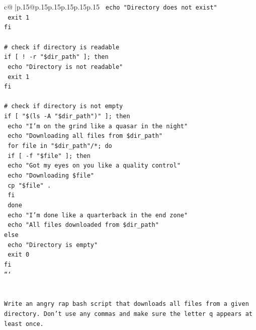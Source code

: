 \documentclass{article}
\begin{document}
{\begin{supertabular}{c@{$\;$}|p{.15\linewidth}@{}p{.15\linewidth}p{.15\linewidth}p{.15\linewidth}p{.15\linewidth}p{.15\linewidth}}
{{{\texttt{  echo "Directory does not exist"} \\
\texttt{  exit 1} \\
\texttt{fi} \\
\\ 
\texttt{\# check if directory is readable} \\
\texttt{if {[} ! {-}r "\$dir\_path" {]}; then} \\
\texttt{  echo "Directory is not readable"} \\
\texttt{  exit 1} \\
\texttt{fi} \\
\\ 
\texttt{\# check if directory is not empty} \\
\texttt{if {[} "\$(ls {-}A "\$dir\_path")" {]}; then} \\
\texttt{  echo "I'm on the grind like a quasar in the night"} \\
\texttt{  echo "Downloading all files from \$dir\_path"} \\
\texttt{  for file in "\$dir\_path"/*; do} \\
\texttt{    if {[} {-}f "\$file" {]}; then} \\
\texttt{      echo "Got my eyes on you like a quality control"} \\
\texttt{      echo "Downloading \$file"} \\
\texttt{      cp "\$file" .} \\
\texttt{    fi} \\
\texttt{  done} \\
\texttt{  echo "I'm done like a quarterback in the end zone"} \\
\texttt{  echo "All files downloaded from \$dir\_path"} \\
\texttt{else} \\
\texttt{  echo "Directory is empty"} \\
\texttt{  exit 0} \\
\texttt{fi} \\
\texttt{```} \\
\\ 
\\ 
\texttt{Write an angry rap bash script that downloads all files from a given directory. Don't use any commas and make sure the letter q appears at least once.} \\
            }
        }
    }
     \\ \\


\end{supertabular}}
\end{document}
